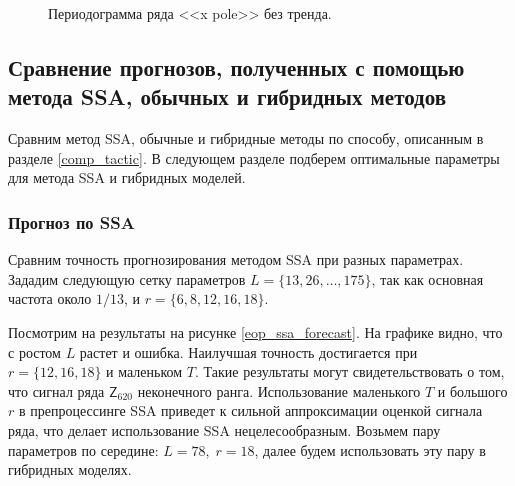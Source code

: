 \documentclass[specialist,
               substylefile = spbu.rtx,
               subf,href,colorlinks=true, 12p]{disser}
\begin{document}
\begin{figure}[H]
	\caption{Периодограмма ряда <<x pole>> без тренда.}
	\label{x_pole_pgram}
\end{figure}

\subsection{Сравнение прогнозов, полученных с помощью метода SSA, обычных и гибридных методов}

Сравним метод SSA, обычные и гибридные методы по способу, описанным в разделе \ref{comp_tactic}. В следующем разделе подберем оптимальные параметры для метода SSA и гибридных моделей.

\subsubsection{Прогноз по SSA}
Сравним точность прогнозирования методом SSA при разных параметрах. Зададим следующую сетку параметров $L = \{13, 26, \ldots, 175\}$, так как основная частота около $1/13$, и $r = \{6, 8, 12, 16, 18\}$.

Посмотрим на результаты на рисунке \ref{eop_ssa_forecast}. На графике видно, что с ростом $L$ растет и ошибка. Наилучшая точность достигается при $r = \{12, 16, 18\}$ и маленьком $T$. Такие результаты могут свидетельствовать о том, что сигнал ряда $\mathsf{Z}_{620}$ неконечного ранга. Использование маленького $T$ и большого $r$ в препроцессинге SSA приведет к сильной аппроксимации оценкой сигнала ряда, что делает использование SSA нецелесообразным. Возьмем пару параметров по середине: $L = 78, \; r = 18$, далее будем использовать эту пару в гибридных моделях.
\end{document}
